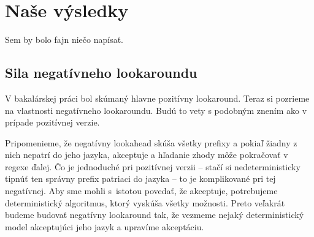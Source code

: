 \chapter{Naše výsledky}
\label{chap:vysledky}

\todo Sem by bolo fajn niečo napísať.

\section{Sila negatívneho lookaroundu}

V bakalárskej práci bol skúmaný hlavne pozitívny lookaround. Teraz si pozrieme na vlastnosti negatívneho lookaroundu. Budú to vety s podobným znením ako v prípade pozitívnej verzie. 

Pripomenieme, že negatívny lookahead skúša všetky prefixy a pokiaľ žiadny z nich nepatrí do jeho jazyka, akceptuje a hľadanie zhody môže pokračovať v regexe ďalej. Čo je jednoduché pri pozitívnej verzii -- stačí si nedeterministicky tipnúť ten správny prefix patriaci do jazyka -- to je komplikované pri tej negatívnej. Aby sme mohli s~istotou povedať, že akceptuje, potrebujeme deterministický algoritmus, ktorý vyskúša všetky možnosti. Preto veľakrát budeme budovať negatívny lookaround tak, že vezmeme nejaký deterministický model akceptujúci jeho jazyk a upravíme akceptáciu.

